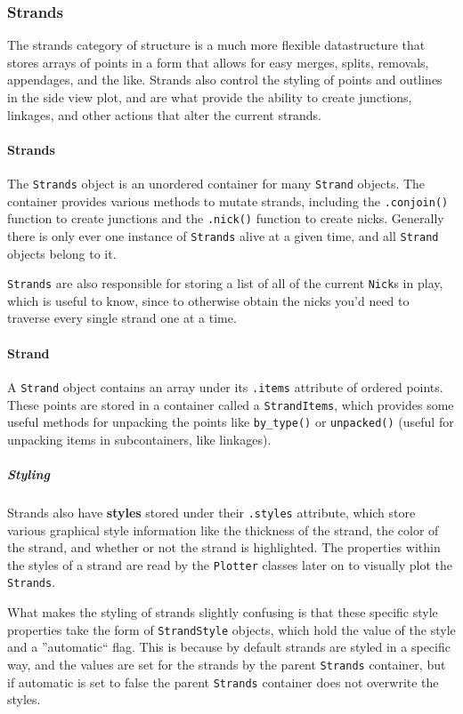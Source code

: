 \documentclass[titlepage]{article}
\begin{document}
	\subsubsection{Strands}
	The strands category of structure is a much more flexible datastructure that stores arrays of points in a form that allows for easy merges, splits, removals, appendages, and the like. Strands also control the styling of points and outlines in the side view plot, and are what provide the ability to create junctions, linkages, and other actions that alter the current strands.
	
	\paragraph{Strands}
	The \texttt{Strands} object is an unordered container for many \texttt{Strand} objects. The container provides various methods to mutate strands, including the \texttt{.conjoin()} function to create junctions and the \texttt{.nick()} function to create nicks. Generally there is only ever one instance of \texttt{Strands} alive at a given time, and all \texttt{Strand} objects belong to it.
	
	\texttt{Strands} are also responsible for storing a list of all of the current \texttt{Nick}s in play, which is useful to know, since to otherwise obtain the nicks you'd need to traverse every single strand one at a time.
	
	\paragraph{Strand}
	A \texttt{Strand} object contains an array under its \texttt{.items} attribute of ordered points. These points are stored in a container called a \texttt{StrandItems}, which provides some useful methods for unpacking the points like \texttt{by\_type()} or \texttt{unpacked()} (useful for unpacking items in subcontainers, like linkages).
	
	\subparagraph{Styling}
	Strands also have \textbf{styles} stored under their \texttt{.styles} attribute, which store various graphical style information like the thickness of the strand, the color of the strand, and whether or not the strand is highlighted. The properties within the styles of a strand are read by the \texttt{Plotter} classes later on to visually plot the \texttt{Strands}.
	
	What makes the styling of strands slightly confusing is that these specific style properties take the form of \texttt{StrandStyle} objects, which hold the value of the style and a ''automatic`` flag. This is because by default strands are styled in a specific way, and the values are set for the strands by the parent \texttt{Strands} container, but if automatic is set to false the parent \texttt{Strands} container does not overwrite the styles. 
	
\end{document}
